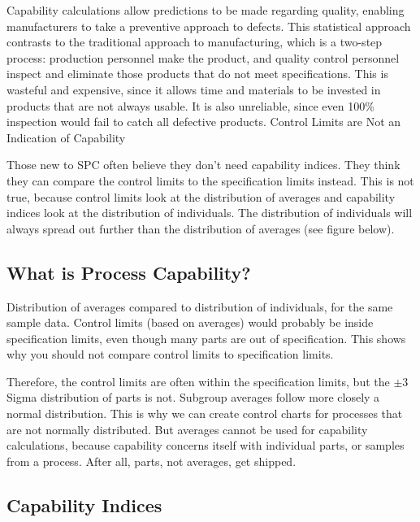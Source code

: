 \documentclass[]{article}
\begin{document}
Capability calculations allow predictions to be made regarding quality, enabling manufacturers to take a preventive approach to defects. This statistical approach contrasts to the traditional approach to manufacturing, which is a two-step process: production personnel make the product, and quality control personnel inspect and eliminate those products that do not meet specifications. This is wasteful and expensive, since it allows time and materials to be invested in products that are not always usable. It is also unreliable, since even 100\% inspection would fail to catch all defective products.
Control Limits are Not an Indication of Capability

Those new to SPC often believe they don’t need capability indices. They think they can compare the control limits to the specification limits instead. This is not true, because control limits look at the distribution of averages and capability indices look at the distribution of individuals. The distribution of individuals will always spread out further than the distribution of averages (see figure below). 
\newpage
\subsection{What is Process Capability?}

Distribution of averages compared to distribution of individuals, for the same sample data. Control limits (based on averages) would probably be inside specification limits, even though many parts are out of specification. This shows why you should not compare control limits to specification limits.

Therefore, the control limits are often within the specification limits, but the $\pm 3$ Sigma distribution of parts is not.  Subgroup averages follow more closely a normal distribution. This is why we can create control charts for processes that are not normally distributed. But averages cannot be used for capability calculations, because capability concerns itself with individual parts, or samples from a process. After all, parts, not averages, get shipped.

\subsection{Capability Indices}
\end{document}
